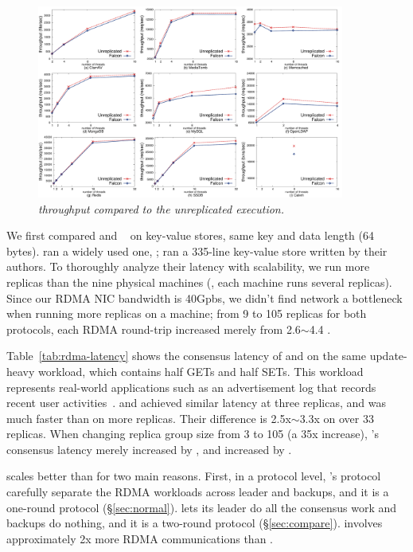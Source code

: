 \begin{figure}[t]
\centering
\includegraphics[width=0.9\textwidth]{figures/throughput}
\vspace{-.10in}
\caption{\small {\em \xxx throughput compared to the unreplicated
execution.}}
\vspace{-.20in}
\label{fig:tput}
\end{figure}

We first compared \xxx and \dare~\cite{dare:hpdc15} on key-value 
stores, same key and data length (64 bytes). \xxx ran a widely used one, 
\redis; \dare ran a 335-line key-value store written by their authors. To 
thoroughly analyze their latency with scalability, we run more replicas than the 
nine physical machines (\ie, each machine runs several replicas). Since our RDMA 
NIC bandwidth is 40Gpbs, we didn't find network a bottleneck when running more 
replicas on a machine; from 9 to 105 replicas for both protocols, each RDMA 
round-trip increased merely from 2.6$\sim$4.4 \us.

Table~\ref{tab:rdma-latency} shows the consensus latency of \xxx and 
\dare on the same update-heavy workload, which contains half GETs and half 
SETs. This workload represents real-world applications such as an advertisement 
log that records recent user activities~\cite{dare:hpdc15}. \xxx and \dare 
achieved similar latency at three replicas, and \xxx was much faster than \dare 
on more replicas. Their difference is 2.5x$\sim$3.3x on over 33 replicas. When 
changing replica group size from 3 to 105 (a 35x increase), \xxx's consensus 
latency merely increased by \xxxscalability, and \dare increased by 
\darescalability.

\xxx scales better than \dare for two main reasons. First, in a protocol level, 
\xxx's protocol carefully separate the RDMA workloads across leader and 
backups, and it is a one-round protocol (\S\ref{sec:normal}). \dare lets its 
leader do all the consensus work and backups do nothing, and it is a two-round 
protocol (\S\ref{sec:compare}). \dare involves approximately 2x more RDMA 
communications than \xxx.

